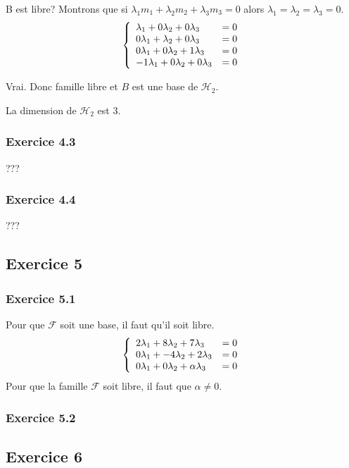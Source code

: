 \documentclass[]{book}
\theoremstyle{definition}
\begin{document}
B est libre? Montrons que si $\lambda_1 m_1 + \lambda_2 m_2 + \lambda_3 m_3 = 0$ alors $\lambda_1 = \lambda_2 = \lambda_3 = 0$.
$$
\left\{ 
\begin{array}{l l}
\lambda_{1} + 0\lambda_{2} + 0\lambda_{3} & = 0\\
0\lambda_{1} + \lambda_{2} + 0\lambda_{3} & = 0\\
0\lambda_{1} + 0\lambda_{2} + 1\lambda_{3} & = 0\\
-1\lambda_{1} + 0\lambda_{2} + 0\lambda_{3} & = 0\\
\end{array}
\right. 
$$ 

Vrai. Donc famille libre et $B$ est une base de $\mathscr{H}_2$.

La dimension de $\mathscr{H}_2$ est 3.

\subsubsection*{Exercice 4.3}
???

\subsubsection*{Exercice 4.4}
???


\subsection*{Exercice 5}
\subsubsection*{Exercice 5.1}
Pour que $\mathscr{F}$ soit une base, il faut qu'il soit libre.
$$
\left\{ 
\begin{array}{l l}
2\lambda_{1} + 8\lambda_{2} + 7\lambda_{3} & = 0\\
0\lambda_{1} + -4\lambda_{2} + 2\lambda_{3} & = 0\\
0\lambda_{1} + 0\lambda_{2} + \alpha \lambda_{3} & = 0\\
\end{array}
\right. 
$$ 
Pour que la famille $\mathscr{F}$ soit libre, il faut que $\alpha \neq 0$.

\subsubsection*{Exercice 5.2}


\subsection*{Exercice 6}
\end{document}
